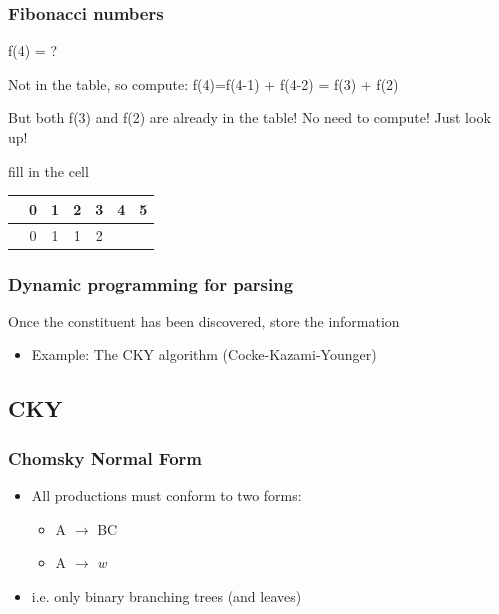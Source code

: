 \documentclass{beamer}
\begin{document}
\begin{frame}
\frametitle{Fibonacci numbers}
f(4) = ?

\vspace{0.5cm}

Not in the table, so compute: f(4)=f(4-1) + f(4-2) = f(3) + f(2) 

\vspace{0.5cm}

But both f(3) and f(2) are already in the table! No need to compute! Just look up!

\vspace{0.5cm}

fill in the cell

\vspace{0.5cm}

\begin{tabular}{c|cccccc}
&0&1&2&3&4&5\\
\hline
&0&1&1&2&&\\
\end{tabular}
\end{frame}


\begin{frame}
\frametitle{Dynamic programming for parsing}

Once the constituent has been discovered, store the information

\begin{itemize}
\item Example: The CKY algorithm (Cocke-Kazami-Younger)
\end{itemize}
\end{frame}


\subsection{CKY}
\begin{frame}
\frametitle{Chomsky Normal Form}
\begin{itemize}
\item All productions must conform to two forms:
\begin{itemize}
\item A $\rightarrow$ BC
\item A $\rightarrow$ {\it w}
\end{itemize}
\item i.e. only binary branching trees (and leaves)
\end{itemize}
\end{frame}
\end{document}

